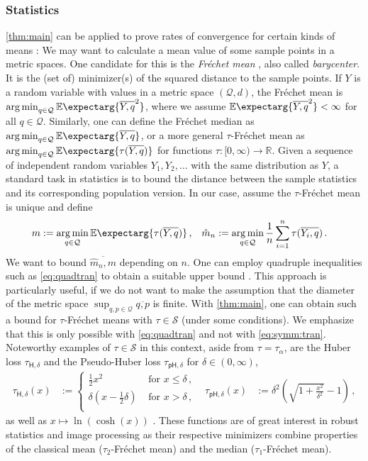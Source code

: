 \documentclass{article}
\newcommand{\lb}{\left(} %
\newcommand{\rb}{\right)} %
\newcommand{\br}[1]{\lb #1 \rb} %
\newcommand*{\E}{\mathbb{E}} %
\newcommand{\Ex}{\E\expectarg}
\newcommand*{\mc}[1]{\mathcal{#1}}
\newcommand*{\ms}[1]{\mathsf{#1}}
\newcommand{\R}{\mathbb{R}}
\newcommand{\Rp}{[0, \infty)} %
\newcommand{\Rpp}{(0, \infty)} %
\newcommand{\equationFullstop}{\, .}
\newcommand{\eqfs}{\equationFullstop}
\newcommand{\equationComma}{\, ,}
\newcommand{\eqcm}{\equationComma}
\DeclareMathOperator*{\argmin}{arg\,min}
\newcommand{\ol}[2]{\overline{#1,#2}}
\newcommand{\tran}{\tau}
\newcommand{\setcc}{\mc S}
\begin{document}
\subsubsection{Statistics}
%
\cref{thm:main} can be applied to prove rates of convergence for certain kinds of means \cite{schoetz19}: We may want to calculate a mean value of some sample points in a metric spaces. One candidate for this is the \textit{Fréchet mean} \cite{frechet48}, also called \textit{barycenter}. It is the (set of) minimizer(s) of the squared distance to the sample points. If $Y$ is a random variable with values in a metric space $(\mc Q, d)$, the Fréchet mean is $\argmin_{q\in\mc Q}\Ex{\ol Yq^2}$, where we assume $\Ex{\ol Yq^2}<\infty$ for all $q\in\mc Q$. Similarly, one can define the Fréchet median \cite{fletcher09} as $\argmin_{q\in\mc Q}\Ex{\ol Yq}$, or a more general $\tran$-Fréchet mean \cite{schoetz22} as $\argmin_{q\in\mc Q}\Ex{\tran(\ol Yq)}$ for functions $\tran\colon\Rp\to\R$. Given a sequence of independent random variables $Y_1, Y_2, \dots$ with the same distribution as $Y$, a standard task in statistics is to bound the distance between the sample statistics and its corresponding population version. In our case, assume the $\tran$-Fréchet mean is unique and define
\begin{align*}
	m &:= \argmin_{q\in\mc Q}\Ex{\tran(\ol Yq)}\eqcm
	&
	\hat m_n &:= \argmin_{q\in\mc Q} \frac 1n \sum_{i=1}^n \tran(\ol {Y_i}q)\eqfs
\end{align*}
We want to bound $\ol {\hat m_n}{m}$ depending on $n$. One can employ quadruple inequalities such as \eqref{eq:quadtran} to obtain a suitable upper bound \cite[Theorem 1]{schoetz19}. This approach is particularly useful, if we do not want to make the assumption that the diameter of the metric space $\sup_{q,p\in\mc Q} \ol qp$ is finite. With \cref{thm:main}, one can obtain such a bound for $\tran$-Fréchet means with $\tran\in\setcc$ (under some conditions). We emphasize that this is only possible with \eqref{eq:quadtran} and not with \eqref{eq:symm:tran}. Noteworthy examples of $\tran\in\setcc$ in this context, aside from $\tran = \tran_\alpha$, are the Huber loss $\tran_{\ms H,\delta}$ \cite{huber64} and the Pseudo-Huber loss $\tran_{\ms{pH},\delta}$ \cite{charbonnier94} for $\delta\in\Rpp$,
 \begin{align*}
	\tran_{\ms H,\delta}(x) &:= 
		\begin{cases}
			\frac12 x^2 & \text{ for } x \leq \delta\eqcm\\
			\delta(x - \frac12 \delta) & \text{ for } x > \delta\eqcm\\
		\end{cases}
	&
	\tran_{\ms{pH},\delta}(x) &:= \delta^2 \br{\sqrt{1 + \frac{x^2}{\delta^2}} - 1}
	\eqcm
\end{align*}
as well as $x\mapsto \ln(\cosh(x))$ \cite{green90}.
These functions are of great interest in robust statistics and image processing as their respective minimizers combine properties of the classical mean ($\tran_2$-Fréchet mean) and the median ($\tran_1$-Fréchet mean).
%
%
%
\end{document}
